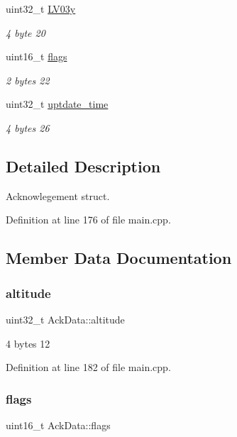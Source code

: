 \begin{DoxyCompactItemize}
uint32\+\_\+t \mbox{\hyperlink{structAckData_a1111544b84d5ecfa27f168d988e28b8f}{L\+V03y}}
\begin{DoxyCompactList}\small\item\em 4 byte 20 \end{DoxyCompactList}\item 
uint16\+\_\+t \mbox{\hyperlink{structAckData_a423568032481378a35f473683a81f949}{flags}}
\begin{DoxyCompactList}\small\item\em 2 bytes 22 \end{DoxyCompactList}\item 
uint32\+\_\+t \mbox{\hyperlink{structAckData_a577cc4e03ced6b2702d3a58260c05123}{uptdate\+\_\+time}}
\begin{DoxyCompactList}\small\item\em 4 bytes 26 \end{DoxyCompactList}\end{DoxyCompactItemize}


\subsection{Detailed Description}
Acknowlegement struct. 

Definition at line 176 of file main.\+cpp.



\subsection{Member Data Documentation}
\mbox{\label{structAckData_acecd408a738b38414650ba1fc89d8bf3}} 
\subsubsection{\texorpdfstring{altitude}{altitude}}
{\footnotesize\ttfamily uint32\+\_\+t Ack\+Data\+::altitude}



4 bytes 12 



Definition at line 182 of file main.\+cpp.

\mbox{\label{structAckData_a423568032481378a35f473683a81f949}} 
\subsubsection{\texorpdfstring{flags}{flags}}
{\footnotesize\ttfamily uint16\+\_\+t Ack\+Data\+::flags}



